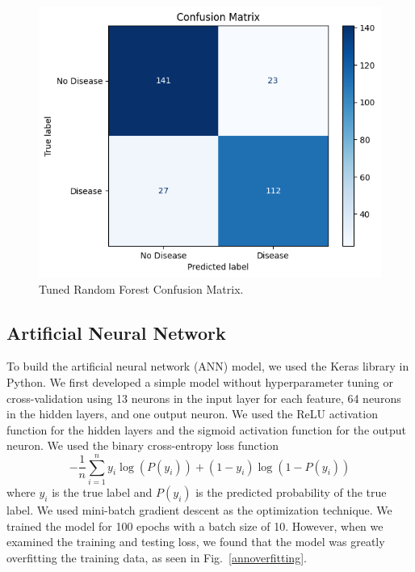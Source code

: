 \begin{figure}[htbp]
    \centerline{\includegraphics[width=0.8\columnwidth]{img/random_forest_confusion.png}}
    \caption{Tuned Random Forest Confusion Matrix.}\label{Tuned Random Forest Confusion Matrix}
\end{figure}

\subsection{Artificial Neural Network}

To build the artificial neural network (ANN) model, we used the Keras library in Python. We first developed a simple model without hyperparameter tuning or cross-validation using 13 neurons in the input layer for each feature, 64 neurons in the hidden layers, and one output neuron. We used the ReLU activation function for the hidden layers and the sigmoid activation function for the output neuron. We used the binary cross-entropy loss function 
\[
-\frac{1}{n}\sum_{i=1}^{n}y_i \log (P(y_i)) + (1 - y_i) \log (1 - P(y_i))
\]
where \(y_i\) is the true label and \(P(y_i)\) is the predicted probability of the true label.
We used mini-batch gradient descent as the optimization technique. We trained the model for 100 epochs with a batch size of 10. However, when we examined the training and testing loss, we found that the model was greatly overfitting the training data, as seen in Fig.~\ref{annoverfitting}. 

